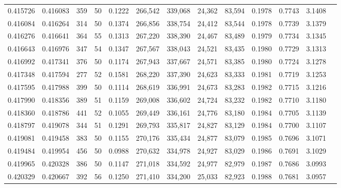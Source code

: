 \begin{tabular}{rrrrrrrrrrrrr}
0.415726 & 0.416083 &   359 &  50 &                                     0.1222 & 266,542 & 339,068 &  24,362 &  83,594 & 0.1978 & 0.7743 & 3.1408 \\
0.416084 & 0.416264 &   314 &  50 &                                     0.1374 & 266,856 & 338,754 &  24,412 &  83,544 & 0.1978 & 0.7739 & 3.1379 \\
0.416276 & 0.416641 &   364 &  55 &                                     0.1313 & 267,220 & 338,390 &  24,467 &  83,489 & 0.1979 & 0.7734 & 3.1345 \\
0.416643 & 0.416976 &   347 &  54 &                                     0.1347 & 267,567 & 338,043 &  24,521 &  83,435 & 0.1980 & 0.7729 & 3.1313 \\
0.416992 & 0.417341 &   376 &  50 &                                     0.1174 & 267,943 & 337,667 &  24,571 &  83,385 & 0.1980 & 0.7724 & 3.1278 \\
0.417348 & 0.417594 &   277 &  52 &                                     0.1581 & 268,220 & 337,390 &  24,623 &  83,333 & 0.1981 & 0.7719 & 3.1253 \\
0.417595 & 0.417988 &   399 &  50 &                                     0.1114 & 268,619 & 336,991 &  24,673 &  83,283 & 0.1982 & 0.7715 & 3.1216 \\
0.417990 & 0.418356 &   389 &  51 &                                     0.1159 & 269,008 & 336,602 &  24,724 &  83,232 & 0.1982 & 0.7710 & 3.1180 \\
0.418360 & 0.418786 &   441 &  52 &                                     0.1055 & 269,449 & 336,161 &  24,776 &  83,180 & 0.1984 & 0.7705 & 3.1139 \\
0.418797 & 0.419078 &   344 &  51 &                                     0.1291 & 269,793 & 335,817 &  24,827 &  83,129 & 0.1984 & 0.7700 & 3.1107 \\
0.419081 & 0.419458 &   383 &  50 &                                     0.1155 & 270,176 & 335,434 &  24,877 &  83,079 & 0.1985 & 0.7696 & 3.1071 \\
0.419484 & 0.419954 &   456 &  50 &                                     0.0988 & 270,632 & 334,978 &  24,927 &  83,029 & 0.1986 & 0.7691 & 3.1029 \\
0.419965 & 0.420328 &   386 &  50 &                                     0.1147 & 271,018 & 334,592 &  24,977 &  82,979 & 0.1987 & 0.7686 & 3.0993 \\
0.420329 & 0.420667 &   392 &  56 &                                     0.1250 & 271,410 & 334,200 &  25,033 &  82,923 & 0.1988 & 0.7681 & 3.0957 \\

\end{tabular}
